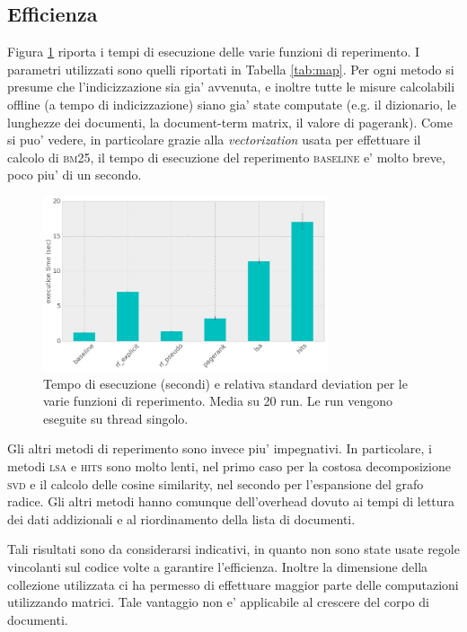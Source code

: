 \subsection{Efficienza}
\label{sec:efficienza}
Figura \ref{fig:efficiency} riporta i tempi di esecuzione delle varie funzioni di reperimento. I parametri utilizzati sono quelli riportati in Tabella \ref{tab:map}. Per ogni metodo si presume che l'indicizzazione sia gia' avvenuta, e inoltre tutte le misure calcolabili offline (a tempo di indicizzazione) siano gia' state computate (e.g. il dizionario, le lunghezze dei documenti, la document-term matrix, il valore di pagerank). Come si puo' vedere, in particolare grazie alla \textit{vectorization} usata per effettuare il calcolo di \textsc{bm25}, il tempo di esecuzione del reperimento \textsc{baseline} e' molto breve, poco piu' di un secondo. 
\begin{figure}[htpb]
	\begin{center}
		\includegraphics[width=0.75\textwidth]{figures/efficiency.png}
		\caption{Tempo di esecuzione (secondi) e relativa standard deviation per le varie funzioni di reperimento. Media su 20 run. Le run vengono eseguite su thread singolo.}
		\label{fig:efficiency}
	\end{center}
\end{figure}
Gli altri metodi di reperimento sono invece piu' impegnativi. In particolare, i metodi \textsc{lsa} e \textsc{hits} sono molto lenti, nel primo caso per la costosa decomposizione \textsc{svd} e il calcolo delle cosine similarity, nel secondo per l'espansione del grafo radice. Gli altri metodi hanno comunque dell'overhead dovuto ai tempi di lettura dei dati addizionali e al riordinamento della lista di documenti.

Tali risultati sono da considerarsi indicativi, in quanto non sono state usate regole vincolanti sul codice volte a garantire l'efficienza. Inoltre la dimensione della collezione  utilizzata ci ha permesso di effettuare maggior parte delle computazioni utilizzando matrici. Tale vantaggio non e' applicabile al crescere del corpo di documenti.

